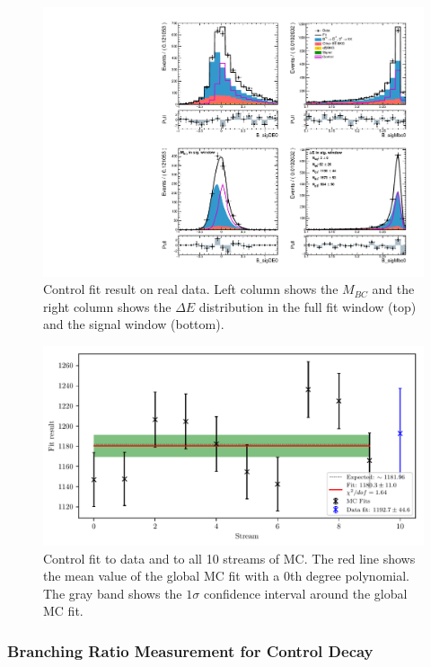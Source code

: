 \begin{figure}[H]
	\centering
	\captionsetup{width=0.8\linewidth}
	\includegraphics[width=\linewidth]{fig/cs_fit_data}
	\caption{Control fit result on real data. Left column shows the $M_{BC}$ and the right column shows the $\Delta E$ distribution in the full fit window (top) and the signal window (bottom).}
	\label{fig:cs_fit_data}
\end{figure}

\begin{figure}[H]
	\centering
	\captionsetup{width=0.8\linewidth}
	\includegraphics[width=\linewidth]{fig/cs_global}
	\caption{Control fit to data and to all 10 streams of MC. The red line shows the mean value of the global MC fit with a 0th degree polynomial. The gray band shows the $1\sigma$ confidence interval around the global MC fit.}
	\label{fig:cs_global}
\end{figure}

\subsubsection{Branching Ratio Measurement for Control Decay}\label{sec:branching-ratio-measurement-for-control-decay}


